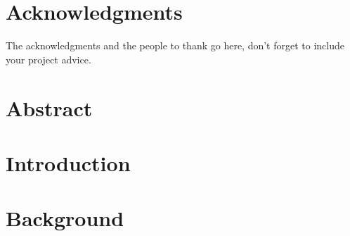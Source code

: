 \documentclass[a4paper,11pt,twoside,openright]{WCarticle}
\begin{document}

\tpage
\pagestyle{plain}

\chapter*{Acknowledgments}
The acknowledgments and the people to thank go here, don't forget to include your project advice. 

\chapter*{Abstract} 


\tableofcontents
\listoffigures
\listoftables
\cleardoublepage
\pagestyle{fancy}

\chapter{Introduction} \label{chap:intro}



\chapter{Background} \label{chap:backgrd}


\iffalse
\chapter{Preliminaries} \label{chap:prelim}


\chapter{Approach} \label{chap:appr}


\chapter{Implementation} \label{chap:impl}


\chapter{Evaluation} \label{chap:eval}



\chapter{Conclusion} \label{chap:conclusion}

\fi

\end{document}
